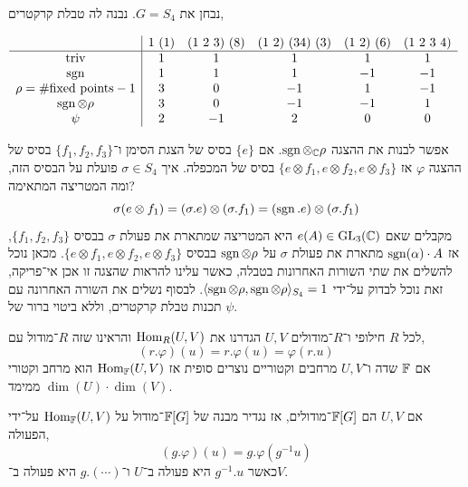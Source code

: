\begin{example}
	נבחן את $G = S_4$.
	נבנה לה טבלת קרקטרים,
	\begin{otherlanguage}{english}
		\begin{center}
			$\begin{array}{c| c c c c c} %
				& 1\ (1) & (1\ 2\ 3)\ (8) & (1\ 2)\ (3 4)\ (3) & (1\ 2)\ (6) & (1\ 2\ 3\ 4) \\
				\hline %
				\text{triv} & 1 & 1 & 1 & 1 & 1 \\
				\sgn & 1 & 1 & 1 & -1 & -1 \\
				\rho = \# \text{fixed points} - 1 & 3 & 0 & -1 & 1 & -1 \\
				\sgn \otimes \rho & 3 & 0 & -1 & -1 & 1 \\
				\psi & 2 & -1 & 2 & 0 & 0
			\end{array}$
		\end{center}
	\end{otherlanguage}
	אפשר לבנות את ההצגה $\operatorname{sgn} \otimes_{\mathbb{C}} \rho$. אם $\{ e \}$ בסיס של הצגת הסימן ו־$\{ f_1, f_2, f_3 \}$ בסיס של ההצגה $\varphi$ אז $\{ e \otimes f_1, e \otimes f_2, e \otimes f_3 \}$ בסיס של המכפלה.
	איך $\sigma \in S_4$ פועלת על הבסיס הזה, ומה המטריצה המתאימה?
	\[
		\sigma (e \otimes f_1)
		= (\sigma . e) \otimes (\sigma . f_1)
		= (\operatorname{sgn} . e) \otimes (\sigma . f_1)
	\]
	מקבלים שאם $e(A) \in \operatorname{GL}_3(\mathbb{C})$ היא המטריצה שמתארת את פעולת $\sigma$ בבסיס $\{f_1, f_2, f_3\}$,
	אז $\operatorname{sgn}(\alpha) \cdot A$ מתארת את פעולת $\sigma$ על $\operatorname{sgn} \otimes \rho$ בבסיס $\{ e \otimes f_1, e \otimes f_2, e \otimes f_3 \}$.
	מכאן נוכל להשלים את שתי השורות האחרונות בטבלה, כאשר עלינו להראות שהצגה זו אכן אי־פריקה, זאת נוכל לבדוק על־ידי $\langle \operatorname{sgn} \otimes \rho, \operatorname{sgn} \otimes \rho \rangle_{S_4} = 1$.
	לבסוף נשלים את השורה האחרונה עם תכנות טבלת קרקטרים, וללא ביטוי ברור של $\psi$.
\end{example}
\begin{remark}
	לכל $R$ חילופי ו־$R$־מודולים $U, V$ הגדרנו את $\operatorname{Hom}_R(U, V)$ והראינו שזה $R$־מודול עם,
	\[
		(r . \varphi)(u)
		= r . \varphi(u)
		= \varphi(r . u)
	\]
	אם $\mathbb{F}$ שדה ו־$U, V$ מרחבים וקטוריים נוצרים סופית אז $\operatorname{Hom}_{\mathbb{F}}(U, V)$ הוא מרחב וקטורי ממימד $\dim(U) \cdot \dim(V)$.
\end{remark}
\begin{definition}
	אם $U, V$ הם $\mathbb{F}[G]$־מודולים, אז נגדיר מבנה של $\mathbb{F}[G]$־מודול על $\operatorname{Hom}_{\mathbb{F}}(U, V)$ על־ידי הפעולה,
	\[
		(g . \varphi)(u)
		= g . \varphi(g^{-1} u)
	\]
	כאשר $g^{-1} . u$ היא פעולה ב־$U$ ו־$g . (\cdots)$ היא פעולה ב־$V$.
\end{definition}
